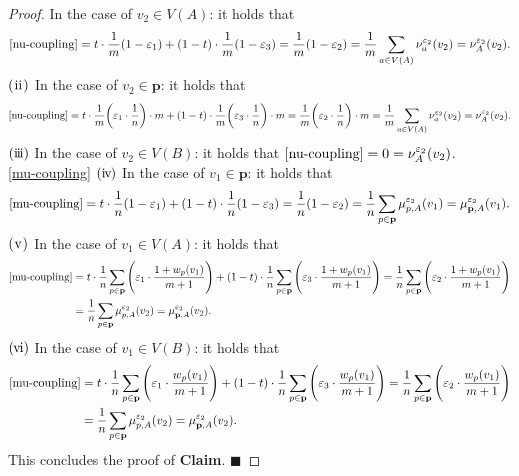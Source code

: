 \documentclass{article}
\numberwithin{equation}{section}
\theoremstyle{definition}
\newcommand{\eps}{\varepsilon} %
\begin{document}
\begin{appendices}
\begin{proof}
In the case of $v_2\in V(A)$: it holds that
\begin{align*}
    \eqref{nu-coupling} = t\cdot\frac{1}{m}(1-\eps_1) + (1-t)\cdot\frac{1}{m}(1-\eps_3)
    = \frac{1}{m}(1-\eps_2) = \frac{1}{m}\sum_{a\in V(A)}\nu_a^{\eps_2}(v_2) = \nu_A^{\eps_2}(v_2).
\end{align*}
$\rm(\hspace{.08em}ii\hspace{.08em})$ 
In the case of $v_2\in \mathbf{p}$: it holds that
\begin{align*}
    \eqref{nu-coupling} 
    = t\cdot\frac{1}{m}\bigg(\eps_1\cdot\frac{1}{n}\bigg)\cdot m + (1-t)\cdot\frac{1}{m}\bigg(\eps_3\cdot\frac{1}{n}\bigg)\cdot m
    = \frac{1}{m}\bigg(\eps_2\cdot\frac{1}{n}\bigg)\cdot m = \frac{1}{m}\sum_{a\in V(A)}\nu_a^{\eps_2}(v_2) = \nu_A^{\eps_2}(v_2).
\end{align*}
$\rm(i\hspace{-.08em}i\hspace{-.08em}i)$ 
In the case of $v_2\in V(B)$: it holds that $\eqref{nu-coupling} = 0 = \nu_A^{\eps_2}(v_2)$. \vspace{1mm} \\
\underline{\eqref{mu-coupling}}
$\rm(i\hspace{-.08em}v\hspace{-.06em})$ 
In the case of $v_1\in \mathbf{p}$: it holds that
\begin{align*}
    \eqref{mu-coupling} = t\cdot\frac{1}{n}(1-\eps_1) + (1-t)\cdot\frac{1}{n}(1-\eps_3)
    = \frac{1}{n}(1-\eps_2) = \frac{1}{n}\sum_{p\in \mathbf{p}}\mu_{p,A}^{\eps_2}(v_1) = \mu_{\mathbf{p},A}^{\eps_2}(v_1).
\end{align*}
$\rm(\hspace{.06em}v\hspace{.06em})$ 
In the case of $v_1\in V(A)$: it holds that
\begin{align*}
    \eqref{mu-coupling} 
    &= t\cdot\frac{1}{n}\sum_{p\in\mathbf{p}}\Bigg(\eps_1\cdot\frac{1+w_p(v_1)}{m+1}\Bigg) + (1-t)\cdot\frac{1}{n}\sum_{p\in\mathbf{p}}\Bigg(\eps_3\cdot\frac{1+w_p(v_1)}{m+1}\Bigg)
    = \frac{1}{n}\sum_{p\in\mathbf{p}}\Bigg(\eps_2\cdot\frac{1+w_p(v_1)}{m+1}\Bigg) \\
    &= \frac{1}{n}\sum_{p\in\mathbf{p}}\mu_{p,A}^{\eps_2}(v_2) = \mu_{\mathbf{p},A}^{\eps_2}(v_2).
\end{align*}
$\rm(\hspace{-.06em}v\hspace{-.08em}i)$ 
In the case of $v_1\in V(B)$: it holds that 
\begin{align*}
    \eqref{mu-coupling} 
    &= t\cdot\frac{1}{n}\sum_{p\in\mathbf{p}}\Bigg(\eps_1\cdot\frac{w_p(v_1)}{m+1}\Bigg) + (1-t)\cdot\frac{1}{n}\sum_{p\in\mathbf{p}}\Bigg(\eps_3\cdot\frac{w_p(v_1)}{m+1}\Bigg)
    = \frac{1}{n}\sum_{p\in\mathbf{p}}\Bigg(\eps_2\cdot\frac{w_p(v_1)}{m+1}\Bigg) \\
    &= \frac{1}{n}\sum_{p\in\mathbf{p}}\mu_{p,A}^{\eps_2}(v_2) = \mu_{\mathbf{p},A}^{\eps_2}(v_2).
\end{align*}
This concludes the proof of \textbf{Claim}. $\blacksquare$


\end{proof}
\end{appendices}
\end{document}

